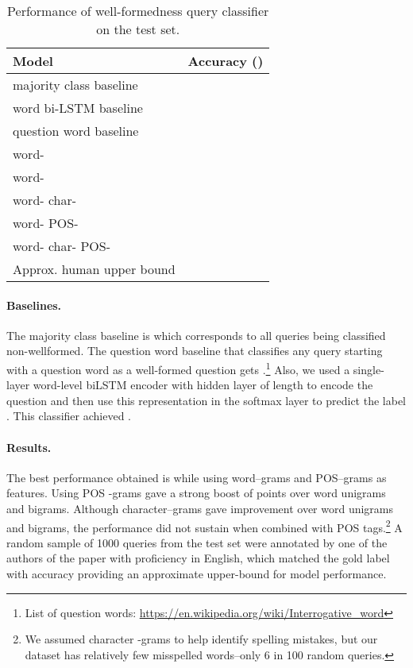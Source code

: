 \documentclass[11pt,a4paper]{article}
\begin{document}
\begin{table}[!tb]
  \centering
  \begin{tabular}{|lr|}
  \hline
  Model & Accuracy ()\\
  \hline
  majority class baseline &  \\
word bi-LSTM baseline &  \\
  question word baseline & \\
  \hline
  word- & \\
  word- & \\
  word- char- & \\
  word- POS- & \\
  word- char- POS- & \\
  \hline
  Approx. human upper bound & \\
  \hline
  \end{tabular}
  \caption{Performance of well-formedness query classifier on the test set.}
  \label{tab:results}
\end{table}

\paragraph{Baselines.} The majority class baseline is  which corresponds to all
queries being classified non-wellformed. The question word baseline that classifies any
query starting with a question word as a well-formed question gets
.\footnote{List of question words: \url{https://en.wikipedia.org/wiki/Interrogative_word}} Also, we
used a single-layer word-level biLSTM encoder with hidden layer of length 
to encode the question and then use this representation in the softmax layer to
predict the label \cite{lee-dernoncourt:2016:N16-1}. This classifier achieved
.

\paragraph{Results.} The best performance obtained is  while
using word--grams and POS--grams as features. Using
POS -grams gave a strong boost of  points over word unigrams and bigrams.
Although character--grams gave improvement over word unigrams and bigrams,
the performance did not sustain when combined with POS tags.\footnote{We
assumed character -grams to help identify spelling mistakes, but our dataset
has relatively few misspelled words--only 6 in 100 random queries.} A random sample of
1000 queries from the test set were annotated by one of the authors
of the paper with proficiency in English, which matched the gold label with
 accuracy providing an approximate upper-bound for model performance.
\end{document}
